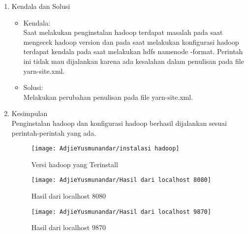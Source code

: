 
\begin{enumerate}
\item Kendala dan Solusi
\begin{itemize}
\item Kendala: \\
Saat melakukan penginstalan hadoop terdapat masalah pada saat mengecek hadoop version dan  pada saat melakukan konfigurasi hadoop terdapat kendala pada saat melakukan hdfs namenode -format. Perintah ini tidak mau dijalankan karena ada kesalahan dalam penulisan pada file yarn-site.xml.

\item Solusi: \\
Melakukan perubahan penulisan pada file yarn-site.xml.
\end{itemize}

\item Kesimpulan \\
Penginstalan hadoop dan konfigurasi hadoop berhasil dijalankan sesuai perintah-perintah yang ada.

\begin{figure}
\setlength{\belowcaptionskip}{-10pt}
\texttt{[image: AdjieYusmunandar/instalasi hadoop]}
\caption{Versi hadoop yang Terinstall}
\end{figure}

\begin{figure}
\setlength{\belowcaptionskip}{-10pt}
\texttt{[image: AdjieYusmunandar/Hasil dari localhost 8080]}
\caption{Hasil dari localhost 8080}
\end{figure}

\begin{figure}
\setlength{\belowcaptionskip}{-10pt}
\texttt{[image: AdjieYusmunandar/Hasil dari localhost 9870]}
\caption{Hasil dari localhost 9870}
\end{figure}
\end{enumerate}

